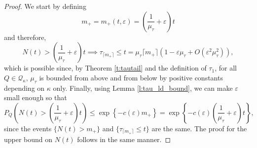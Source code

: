 \documentclass[10pt,a4paper]{amsart}
\newcommand{\mutau}{\mu_{\tau}}
\begin{document}
\begin{proof}
    We start by defining
    \begin{equation}
        \label{eq:mplusdef}
        m_+ = m_+(t, \varepsilon)
            = 
            \left(
                \frac{1}{\mutau} + 
                \varepsilon
            \right)
            t
    \end{equation}
    and therefore,
    \begin{equation}
        \label{eq:Ntldimplication}
        N(t) 
            >
        \left(
            \frac{1}{\mutau} + 
            \varepsilon
        \right)
        t
            \implies
                \tau_{\lceil m_+ \rceil} \leq t 
               = \mutau \lceil m_+ \rceil\left(1-\varepsilon\mutau + O(\varepsilon^2\mutau^2) \right),
    \end{equation}
    which is possible since, by Theorem \ref{t:tautail} and the definition of $\tau_1$, for all $Q \in \mathcal{Q}_\kappa$, $\mutau$ is bounded from above and from below by positive constants depending on $\kappa$ only. Finally, using Lemma \ref{l:tau_ld_bound}, we can make $\varepsilon$ small enough so that
    \begin{equation}
        \label{eq:Ntldbound2}
        P_Q \left(
            N(t) 
                >
            \left(
                \frac{1}{\mutau} + 
                \varepsilon
            \right)
            t
        \right)
        \leq
            \exp
            \left\{
                -c(\varepsilon) m_+
            \right\}
        =
            \exp
            \left\{
                -c(\varepsilon)  
                \left(
                    \frac{1}{\mutau} + 
                    \varepsilon
                \right)
                t
            \right\},
    \end{equation}
    since the events $\{N(t) > m_+\}$ and $\{\tau_{\lceil m_+ \rceil} \leq t\}$ are the same. The proof for the upper bound on $N(t)$ follows in the same manner.
\end{proof}
\end{document}
